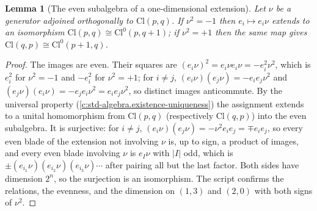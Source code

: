\documentclass[11pt]{article}
\newtheorem{lemma}[theorem]{Lemma}
\theoremstyle{definition}
\theoremstyle{plain}
\providecommand{\Cl}{}\renewcommand{\Cl}{\mathrm{Cl}}
\begin{document}
\begin{lemma}[The even subalgebra of a one-dimensional extension]\label{c:transport.even-subalgebra-one-dimensional-extension}
Let $\nu$ be a generator adjoined orthogonally to $\Cl(p,q)$. If $\nu^2 = -1$ then $e_i \mapsto e_i\nu$ extends to an isomorphism $\Cl(p,q) \cong \Cl^0(p,q{+}1)$; if $\nu^2 = +1$ then the same map gives $\Cl(q,p) \cong \Cl^0(p{+}1,q)$.
\end{lemma}
\begin{proof}
The images are even. Their squares are $(e_i\nu)^2 = e_i\nu e_i\nu = -e_i^2\nu^2$, which is $e_i^2$ for $\nu^2 = -1$ and $-e_i^2$ for $\nu^2 = +1$; for $i \neq j$, $(e_i\nu)(e_j\nu) = -e_ie_j\nu^2$ and $(e_j\nu)(e_i\nu) = -e_je_i\nu^2 = e_ie_j\nu^2$, so distinct images anticommute. By the universal property (\ref{c:std-algebra.existence-uniqueness}) the assignment extends to a unital homomorphism from $\Cl(p,q)$ (respectively $\Cl(q,p)$) into the even subalgebra. It is surjective: for $i \neq j$, $(e_i\nu)(e_j\nu) = -\nu^2 e_ie_j = \mp e_ie_j$, so every even blade of the extension not involving $\nu$ is, up to sign, a product of images, and every even blade involving $\nu$ is $e_I\nu$ with $|I|$ odd, which is $\pm(e_{i_1}\nu)(e_{i_2}\nu)(e_{i_3}\nu)\cdots$ after pairing all but the last factor. Both sides have dimension $2^n$, so the surjection is an isomorphism. The script confirms the relations, the evenness, and the dimension on $(1,3)$ and $(2,0)$ with both signs of $\nu^2$.

\end{proof}
\end{document}
